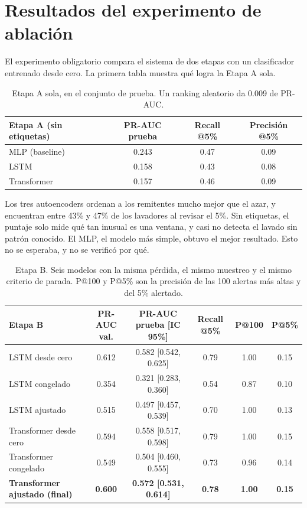 \documentclass[11pt]{article}
\begin{document}
\section{Resultados del experimento de ablación}

El experimento obligatorio compara el sistema de dos etapas con un clasificador entrenado desde cero. La primera tabla muestra qué logra la Etapa A sola.

\begin{table}[ht]
\centering
\begin{tabular}{lccc}
\toprule
Etapa A (sin etiquetas) & PR-AUC prueba & Recall @5\% & Precisión @5\% \\
\midrule
MLP (baseline) & 0.243 & 0.47 & 0.09 \\
LSTM & 0.158 & 0.43 & 0.08 \\
Transformer & 0.157 & 0.46 & 0.09 \\
\bottomrule
\end{tabular}
\caption{Etapa A sola, en el conjunto de prueba. Un ranking aleatorio da 0.009 de PR-AUC.}
\label{tab:etapaa}
\end{table}

Los tres autoencoders ordenan a los remitentes mucho mejor que el azar, y encuentran entre 43\% y 47\% de los lavadores al revisar el 5\%. Sin etiquetas, el puntaje solo mide qué tan inusual es una ventana, y casi no detecta el lavado sin patrón conocido. El MLP, el modelo más simple, obtuvo el mejor resultado. Esto no se esperaba, y no se verificó por qué.

\begin{table}[ht]
\centering
\small
\setlength{\tabcolsep}{3pt}
\begin{tabular}{lccccc}
\toprule
Etapa B & PR-AUC val. & PR-AUC prueba [IC 95\%] & Recall @5\% & P@100 & P@5\% \\
\midrule
LSTM desde cero & 0.612 & 0.582 [0.542, 0.625] & 0.79 & 1.00 & 0.15 \\
LSTM congelado & 0.354 & 0.321 [0.283, 0.360] & 0.54 & 0.87 & 0.10 \\
LSTM ajustado & 0.515 & 0.497 [0.457, 0.539] & 0.70 & 1.00 & 0.13 \\
Transformer desde cero & 0.594 & 0.558 [0.517, 0.598] & 0.79 & 1.00 & 0.15 \\
Transformer congelado & 0.549 & 0.504 [0.460, 0.555] & 0.73 & 0.96 & 0.14 \\
\textbf{Transformer ajustado (final)} & \textbf{0.600} & \textbf{0.572 [0.531, 0.614]} & \textbf{0.78} & \textbf{1.00} & \textbf{0.15} \\
\bottomrule
\end{tabular}
\caption{Etapa B. Seis modelos con la misma pérdida, el mismo muestreo y el mismo criterio de parada. P@100 y P@5\% son la precisión de las 100 alertas más altas y del 5\% alertado.}
\label{tab:etapab}
\end{table}
\end{document}

